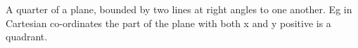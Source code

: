 A quarter of a plane, bounded by two lines at right angles to
one another. Eg in Cartesian co-ordinates the part of the
plane with both x and y positive is a quadrant.